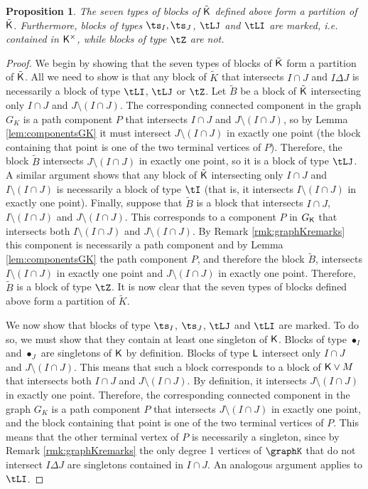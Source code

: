 \documentclass[11pt, a4paper, oneside, reqno]{amsart}
\newcommand{\sK}{{\sf K}}
\newtheorem{proposition}[theorem]{Proposition}
\theoremstyle{remark}
\theoremstyle{definition}
\numberwithin{equation}{section}
\begin{document}
\begin{proposition} \label{prop:types}
	The seven types of blocks of $\tilde{\sK}$ defined above form a partition of $\tilde{\sK}$. Furthermore, blocks of types $\ts_I,\ts_J$, $\tLJ$ and $\tLI$ are marked, i.e. contained in $\sK^{\times}$, while blocks of type $\tZ$ are not.
\end{proposition}
\begin{proof}
 We begin by showing that the seven types of blocks of $\tilde \sK$ form a partition of $\tilde \sK$. All we need to show is that any block of $\tilde{K}$ that intersects $I \cap J$ and $I\Delta J$ is necessarily a block of type $\tLI$, $\tLJ$ or $\tZ$. Let $\tilde{B}$ be a block of $\tilde{\sK}$ intersecting only $I \cap J$ and $J \setminus (I \cap J)$. The corresponding connected component in the graph $G_K$ is a path component $P$ that intersects $I \cap J$ and $J\setminus (I\cap J)$, so by Lemma \ref{lem:componentsGK} it must intersect $J\setminus (I \cap J) $ in exactly one point (the block containing that point is one of the two terminal vertices of $P$). Therefore, the block $\tilde{B}$ intersects $J\setminus (I \cap J)$ in exactly one point, so it is a block of type $\tLJ$. A similar argument shows that any block of $\tilde{\sK}$ intersecting only $I \cap J$ and $I\setminus (I\cap J)$ is necessarily a block of type $\tI$ (that is, it intersects $I \setminus (I \cap J)$ in exactly one point). Finally, suppose that $\tilde{B}$ is a block that intersects $I\cap J$, $I\setminus (I \cap J)$ and $J \setminus (I \cap J)$. This corresponds to a component $P$ in $G_{\sf K}$ that intersects both $I \setminus (I\cap J)$ and $J \setminus (I\cap J)$. By Remark \ref{rmk:graphKremarks} this component is necessarily a path component and by Lemma \ref{lem:componentsGK} the path component $P$, and therefore the block $\tilde{B}$, intersects $I \setminus (I\cap J)$ in exactly one point and $J \setminus (I \cap J)$ in exactly one point. Therefore, $\tilde{B}$ is a block of type $\tZ$. It is now clear that the seven types of blocks defined above form a partition of $\tilde{K}$.
 
	We now show that blocks of type $\ts_I$, $\ts_J$, $\tLJ$ and $\tLI$ are marked. To do so, we must show that they contain at least one singleton of ${\sf K}$. Blocks of type $\bullet_I$ and $\bullet_J$ are singletons of ${\sf K}$ by definition. Blocks of type ${\sf L}$ intersect only $I \cap J$ and $J \setminus (I \cap J)$. This means that such a block corresponds to a block of ${\sf K} \vee M$ that intersects both $I \cap J$ and $J\setminus (I\cap J)$. By definition, it intersects $J \setminus (I \cap J)$ in exactly one point. Therefore, the corresponding connected component in the graph $G_K$ is a path component $P$ that intersects $J\setminus (I\cap J)$ in exactly one point, and the block containing that point is one of the two terminal vertices of $P$. This means that the other terminal vertex of $P$ is necessarily a singleton, since by Remark \ref{rmk:graphKremarks}   the only degree 1 vertices of $\graphK$ that do not intersect $I \Delta J$ are singletons contained in $I \cap J$.
	An analogous argument applies to $\tLI$.


\end{proof}
\end{document}
